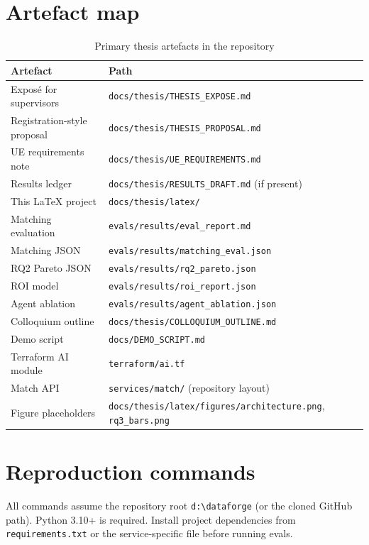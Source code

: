 \chapter{Artefact map}
\label{app:artefacts}

\begin{table}[ht]
\centering
\caption{Primary thesis artefacts in the repository}
\label{tab:artefacts}
\begin{tabularx}{\textwidth}{@{}lX@{}}
\toprule
\textbf{Artefact} & \textbf{Path} \\
\midrule
Expos\'e for supervisors & \texttt{docs/thesis/THESIS\_EXPOSE.md} \\
Registration-style proposal & \texttt{docs/thesis/THESIS\_PROPOSAL.md} \\
UE requirements note & \texttt{docs/thesis/UE\_REQUIREMENTS.md} \\
Results ledger & \texttt{docs/thesis/RESULTS\_DRAFT.md} (if present) \\
This \LaTeX{} project & \texttt{docs/thesis/latex/} \\
Matching evaluation & \texttt{evals/results/eval\_report.md} \\
Matching JSON & \texttt{evals/results/matching\_eval.json} \\
RQ2 Pareto JSON & \texttt{evals/results/rq2\_pareto.json} \\
ROI model & \texttt{evals/results/roi\_report.json} \\
Agent ablation & \texttt{evals/results/agent\_ablation.json} \\
Colloquium outline & \texttt{docs/thesis/COLLOQUIUM\_OUTLINE.md} \\
Demo script & \texttt{docs/DEMO\_SCRIPT.md} \\
Terraform AI module & \texttt{terraform/ai.tf} \\
Match API & \texttt{services/match/} (repository layout) \\
Figure placeholders & \texttt{docs/thesis/latex/figures/architecture.png}, \texttt{rq3\_bars.png} \\
\bottomrule
\end{tabularx}
\end{table}

\chapter{Reproduction commands}
\label{app:repro}

All commands assume the repository root \texttt{d:\textbackslash dataforge} (or the cloned GitHub path). Python 3.10+ is required. Install project dependencies from \texttt{requirements.txt} or the service-specific file before running evals.


